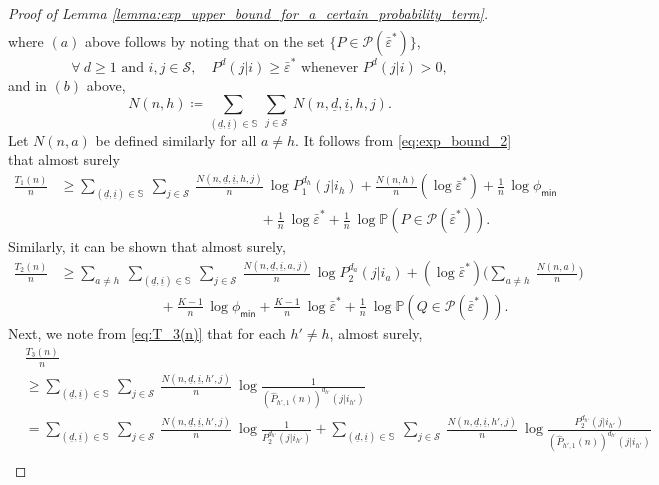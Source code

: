 \begin{proof}[Proof of Lemma \ref{lemma:exp_upper_bound_for_a_certain_probability_term}]
\begin{align}
	\label{eq:exp_bound_2}
\end{align}
where $(a)$ above follows by noting that on the set $\{P\in \mathscr{P}(\bar{\varepsilon}^*)\}$, $$\forall~ d\geq 1 \text{ and }i, j\in \mathcal{S}, \quad P^d(j|i)\geq\bar{\varepsilon}^*  \text{ whenever } P^d(j|i)>0,$$ and in $(b)$ above, $$ N(n, h)\coloneqq \sum\limits_{(\underline{d}, \underline{i})\in \mathbb{S}}~\sum\limits_{j\in \mathcal{S}} ~N(n, \underline{d}, \underline{i}, h, j).$$ Let $N(n, a)$ be defined similarly for all $a\neq h$. It follows from \eqref{eq:exp_bound_2} that almost surely
\begin{align}
	\frac{T_1(n)}{n} &\geq \sum\limits_{(\underline{d}, \underline{i})\in \mathbb{S}}~\sum\limits_{j\in \mathcal{S}}~\frac{N(n, \underline{d}, \underline{i}, h, j)}{n}~\log P_1^{d_h}(j|i_h)+\frac{N(n, h)}{n}(\log \bar{\varepsilon}^*) + \frac{1}{n}\,\log\phi_{\textsf{min}} \nonumber\\
	&\hspace{6cm}+  \frac{1}{n}~\log\bar{\varepsilon}^* + \frac{1}{n}~\log \mathbb{P}(P\in \mathscr{P}(\bar{\varepsilon}^*)).
	\label{eq:lower_bound_for_T_1(n)/n}
\end{align}
Similarly, it can be shown that almost surely,
\begin{align}
	\frac{T_2(n)}{n} &\geq \sum\limits_{a\neq h}~\sum\limits_{(\underline{d}, \underline{i})\in \mathbb{S}}~\sum\limits_{j\in \mathcal{S}}~\frac{N(n, \underline{d}, \underline{i}, a, j)}{n}~\log P_2^{d_a}(j|i_a)+(\log \bar{\varepsilon}^*)\bigg(\sum\limits_{a\neq h}~\frac{N(n, a)}{n}\bigg) \nonumber\\
	&\hspace{3cm}+ \frac{K-1}{n}\,\log \phi_{\textsf{min}} + \frac{K-1}{n}~\log\bar{\varepsilon}^* +  \frac{1}{n}~\log \mathbb{P}(Q\in \mathscr{P}(\bar{\varepsilon}^*)).
	\label{eq:lower_bound_on_T_2(n)/n}
\end{align}
Next, we note from \eqref{eq:T_3(n)} that for each $h'\neq h$, almost surely,
\begin{align}
	&\frac{T_3(n)}{n}\nonumber\\
	&\geq \sum\limits_{(\underline{d}, \underline{i})\in \mathbb{S}}~\sum\limits_{j\in \mathcal{S}}~\frac{N(n, \underline{d}, \underline{i}, h', j)}{n}~\log\frac{1}{(\hat{P}_{h', 1}(n))^{d_{h'}}(j|i_{h'})}\nonumber\\
	&=\sum\limits_{(\underline{d}, \underline{i})\in \mathbb{S}}~\sum\limits_{j\in \mathcal{S}}~\frac{N(n, \underline{d}, \underline{i}, h', j)}{n}~\log\frac{1}{P_2^{d_{h'}}(j|i_{h'})}+\sum\limits_{(\underline{d}, \underline{i})\in \mathbb{S}}~\sum\limits_{j\in \mathcal{S}}~\frac{N(n, \underline{d}, \underline{i}, h', j)}{n}~\log\frac{P_2^{d_{h'}}(j|i_{h'})}{(\hat{P}_{h', 1}(n))^{d_{h'}}(j|i_{h'})}\nonumber\\

\end{align}
\end{proof}
